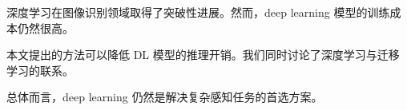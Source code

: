深度学习在图像识别领域取得了突破性进展。然而，deep learning 模型的训练成本仍然很高。

本文提出的方法可以降低 DL 模型的推理开销。我们同时讨论了深度学习与迁移学习的联系。

总体而言，deep learning 仍然是解决复杂感知任务的首选方案。

